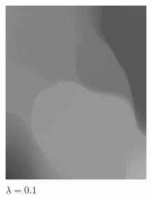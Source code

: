 \documentclass{paper}
\begin{document}
\begin{figure}[ht]
\centering
\begin{subfigure}[ht]{0.3\textwidth}
	\centering
	\includegraphics[width=\textwidth]{result-cat-lambda0_1-theta0_5-iter1500}
	\caption*{$\lambda = 0.1$}
\end{subfigure}
~
\begin{subfigure}[ht]{0.3\textwidth}
	\centering

\end{subfigure}
\end{figure}
\end{document}
